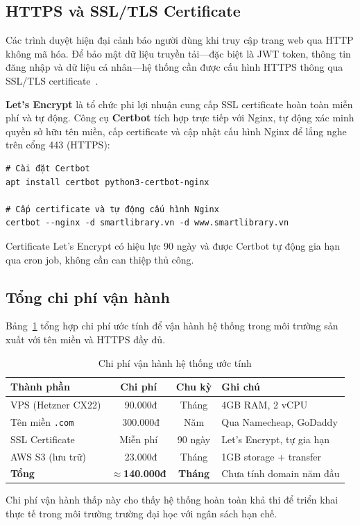 \subsection{HTTPS và SSL/TLS Certificate}

Các trình duyệt hiện đại cảnh báo người dùng khi truy cập trang web qua HTTP
không mã hóa. Để bảo mật dữ liệu truyền tải---đặc biệt là JWT token, thông
tin đăng nhập và dữ liệu cá nhân---hệ thống cần được cấu hình HTTPS thông qua
SSL/TLS certificate~\cite{letsencrypt}.

\textbf{Let's Encrypt} là tổ chức phi lợi nhuận cung cấp SSL certificate hoàn
toàn miễn phí và tự động. Công cụ \textbf{Certbot} tích hợp trực tiếp với
Nginx, tự động xác minh quyền sở hữu tên miền, cấp certificate và cập nhật
cấu hình Nginx để lắng nghe trên cổng 443 (HTTPS):

\begin{verbatim}
# Cài đặt Certbot
apt install certbot python3-certbot-nginx

# Cấp certificate và tự động cấu hình Nginx
certbot --nginx -d smartlibrary.vn -d www.smartlibrary.vn
\end{verbatim}

Certificate Let's Encrypt có hiệu lực 90 ngày và được Certbot tự động gia hạn
qua cron job, không cần can thiệp thủ công.

\subsection{Tổng chi phí vận hành}

Bảng~\ref{tab:hosting_cost} tổng hợp chi phí ước tính để vận hành hệ thống
trong môi trường sản xuất với tên miền và HTTPS đầy đủ.

\begin{table}[h]
\centering
\caption{Chi phí vận hành hệ thống ước tính}
\label{tab:hosting_cost}
\begin{tabular}{|l|c|c|l|}
\hline
\textbf{Thành phần} & \textbf{Chi phí} & \textbf{Chu kỳ} & \textbf{Ghi chú} \\
\hline
VPS (Hetzner CX22)   & ~90.000đ  & Tháng   & 4GB RAM, 2 vCPU \\
\hline
Tên miền \texttt{.com} & ~300.000đ & Năm     & Qua Namecheap, GoDaddy \\
\hline
SSL Certificate      & Miễn phí  & 90 ngày & Let's Encrypt, tự gia hạn \\
\hline
AWS S3 (lưu trữ)     & ~23.000đ  & Tháng   & 1GB storage + transfer \\
\hline
\textbf{Tổng}        & \textbf{$\approx$140.000đ} & \textbf{Tháng} & Chưa tính domain năm đầu \\
\hline
\end{tabular}
\end{table}

\noindent Chi phí vận hành thấp này cho thấy hệ thống hoàn toàn khả thi để
triển khai thực tế trong môi trường trường đại học với ngân sách hạn chế.
